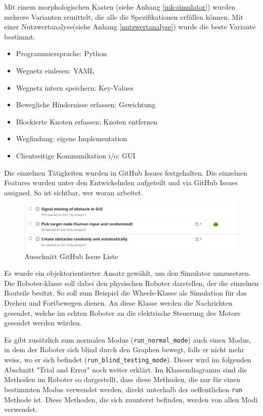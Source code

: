 Mit einem morphologischen Kasten (siehe Anhang \ref{mk-simulator}) wurden mehrere Varianten ermittelt, die alle die Spezifikationen erfüllen können. Mit einer Nutzwertanalyse(siehe Anhang \ref{nutzwertanalyse}) wurde die beste Variante bestimmt.

\begin{itemize}
    \item Programmiersprache: Python
    \item Wegnetz einlesen: YAML
    \item Wegnetz intern speichern: Key-Values
    \item Bewegliche Hindernisse erfassen: Gewichtung
    \item Blockierte Knoten erfassen: Knoten entfernen
    \item Wegfindung: eigene Implementation
    \item Clientseitige Kommunikation \acrshort{i/o}: GUI
\end{itemize}

Die einzelnen Tätigkeiten wurden in GitHub Issues festgehalten. Die einzelnen Features wurden unter den Entwickelnden aufgeteilt und via GitHub Issues assigned. So ist sichtbar, wer woran arbeitet.

\begin{figure}[H]
\centering
\includegraphics[width=\textwidth]{img/github-issues.png}
\caption{Ausschnitt GitHub Issue Liste}
\label{fig:github-issues}
\end{figure}

Es wurde ein objektorientierter Ansatz gewählt, um den Simulator umzusetzen. Die Roboter-klasse soll dabei den physischen Roboter darstellen, der die einzelnen Bauteile besitzt. So soll zum Beispiel die Wheels-Klasse als Simulation für das Drehen und Fortbewegen dienen. An diese Klasse werden die Nachrichten gesendet, welche im echten Roboter an die elektrische Steuerung des Motors gesendet werden würden.

Es gibt zusätzlich zum normalen Modus (\verb|run_normal_mode|) auch einen Modus, in dem der Roboter sich blind durch den Graphen bewegt, falls er nicht mehr weiss, wo er sich befindet (\verb|run_blind_testing_mode|). Dieser wird im folgenden Abschnitt "Trial and Error" noch weiter erklärt. Im Klassendiagramm sind die Methoden im Roboter so dargestellt, dass diese Methoden, die nur für einen bestimmten Modus verwendet werden, direkt unterhalb der oeffentlichen \verb|run| Methode ist. Diese Methoden, die sich zuunterst befinden, werden von allen Modi verwendet. 


